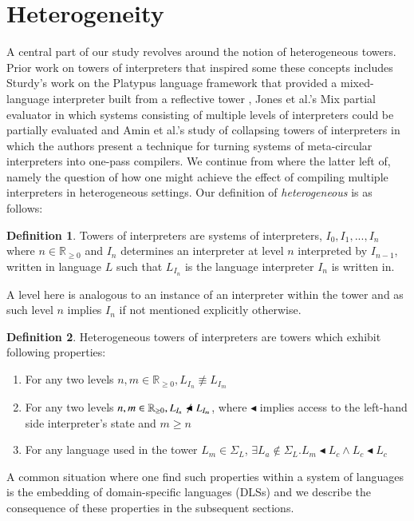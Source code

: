 \documentclass[a4paper,12pt,twoside,openright]{report}
\theoremstyle{definition}
\newtheorem{definition}{Definition}[section]
\begin{document}
\section{Heterogeneity}
A central part of our study revolves around the notion of heterogeneous towers. Prior work on towers of interpreters that inspired some these concepts includes Sturdy's work on the Platypus language framework that provided a mixed-language interpreter built from a reflective tower \cite{sturdy1993lisp}, Jones et al.'s Mix partial evaluator \cite{jones1989mix} in which systems consisting of multiple levels of interpreters could be partially evaluated and Amin et al.'s study of collapsing towers of interpreters in which the authors present a technique for turning systems of meta-circular interpreters into one-pass compilers. We continue from where the latter left of, namely the question of how one might achieve the effect of compiling multiple interpreters in heterogeneous settings. Our definition of \textit{heterogeneous} is as follows:
\theoremstyle{definition}
\begin{definition}
	Towers of interpreters are systems of interpreters, $I_0, I_1, ..., I_n$ where $n \in \mathbb R_{\ge 0}$ and $I_n$ determines an interpreter at level $n$ interpreted by $I_{n-1}$, written in language $L$ such that $L_{I_n}$ is the language interpreter $I_n$ is written in.
\end{definition}

A level here is analogous to an instance of an interpreter within the tower and as such level $n$ implies $I_n$ if not mentioned explicitly otherwise.

\begin{definition}
	Heterogeneous towers of interpreters are towers which exhibit following properties:
	\begin{enumerate}
		\item For any two levels $n, m \in \mathbb R_{\ge 0}, L_{I_n} \not\equiv L_{I_m}$
		\item For any two levels $n, m \in \mathbb R_{\ge 0}, L_{I_n} \not\blacktriangleleft L_{I_m}$, where $\blacktriangleleft$ implies access to the left-hand side interpreter's state and $m \ge n$
		\item For any language used in the tower $L_m \in \Sigma_L$, $\exists L_a \not\in \Sigma_L.L_m \blacktriangleleft L_c \land L_c \blacktriangleleft L_c$
	\end{enumerate}
\end{definition}\label{def:het}
A common situation where one find such properties within a system of languages is the embedding of domain-specific languages (DLSs) and we describe the consequence of these properties in the subsequent sections.
\end{document}
